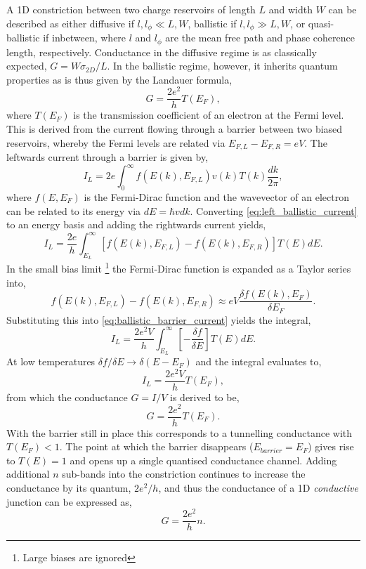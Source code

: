 \documentclass[a4paper]{article}
\begin{document}
A 1D constriction between two charge reservoirs of length $L$ and width $W$ can be described as either diffusive if $l,l_\phi \ll L,W$, ballistic if $l,l_\phi \gg L,W$, or quasi-ballistic if inbetween, where $l$ and $l_\phi$ are the mean free path and phase coherence length, respectively. Conductance in the diffusive regime is as classically expected, $G=W\sigma_{2D}/L$. In the ballistic regime, however, it inherits quantum properties as is thus given by the Landauer formula,
\begin{equation} G=\frac{2e^2}{h}T(E_F), \end{equation}
where $T(E_F)$ is the transmission coefficient of an electron at the Fermi level. This is derived from the current flowing through a barrier between two biased reservoirs, whereby the Fermi levels are related via $E_{F,L} - E_{F,R} = eV$. The leftwards current through a barrier is given by,
\begin{equation}
	I_L = 2e \int_0^\infty f(E(k), E_{F,L}) v(k) T(k) \frac{dk}{2\pi},
	\label{eq:left_ballistic_current}
\end{equation}
where $f(E, E_F)$ is the Fermi-Dirac function and the wavevector of an electron can be related to its energy via $dE = \hbar v dk$. Converting \eqref{eq:left_ballistic_current} to an energy basis and adding the rightwards current yields,
\begin{equation}
	I_L = \frac{2e}{h} \int_{E_{L}}^\infty \left[ f(E(k), E_{F,L}) - f(E(k), E_{F,R}) \right] T(E) dE.
	\label{eq:ballistic_barrier_current}
\end{equation}
In the small bias limit%
\footnote{Large biases are ignored}
the Fermi-Dirac function is expanded as a Taylor series into,
\begin{equation}
	f(E(k), E_{F,L}) - f(E(k), E_{F,R}) \approx eV \frac{\delta f(E(k), E_F)}{\delta E_F}.
\end{equation}
Substituting this into \eqref{eq:ballistic_barrier_current} yields the integral,
\begin{equation}
	I_L = \frac{2e^2V}{h} \int_{E_{L}}^\infty \left[ -\frac{\delta f}{\delta E} \right] T(E) dE.
\end{equation}
At low temperatures $\delta f/\delta E \rightarrow \delta(E-E_F)$ and the integral evaluates to,
\begin{equation}
	I_L = \frac{2e^2V}{h}T(E_F),
\end{equation}
from which the conductance $G=I/V$ is derived to be,
\begin{equation}
		G = \frac{2e^2}{h}T(E_F).
\end{equation}
With the barrier still in place this corresponds to a tunnelling conductance with $T(E_F)<1$. The point at which the barrier disappears ($E_{barrier} = E_F$) gives rise to $T(E) = 1$ and opens up a single quantised conductance channel. Adding additional $n$ sub-bands into the constriction continues to increase the conductance by its quantum, $2e^2/h$, and thus the conductance of a 1D \emph{conductive} junction can be expressed as,
\begin{equation}
	G = \frac{2e^2}{h}n.
\end{equation}
\end{document}
